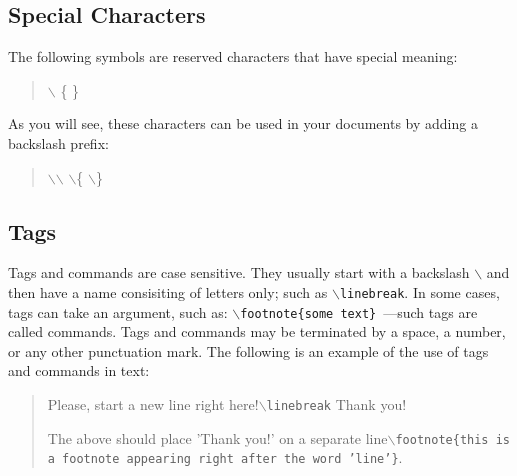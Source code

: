 \documentclass[11pt]{article}
\newcommand{\cmd}[1]{{\tt $\backslash$#1}}
\begin{document}
\newpage

\subsection{Special Characters}

The following symbols are reserved characters that have special
meaning:

\begin{quote}
$\backslash$ \{ \}
\end{quote}

\noindent As you will see, these characters can be used in your documents
by adding a backslash prefix:

\begin{quote}
$\backslash$$\backslash$ $\backslash$\{ $\backslash$\}
\end{quote}









\subsection{Tags}

Tags and commands are case sensitive. They usually start with a
backslash $\backslash$ and then have a name consisiting of letters
only; such as \cmd{linebreak}. In some cases, tags can take an argument,
such as: \cmd{footnote\{some text\}}\ ---such tags are called
commands. Tags and commands may be terminated by a space, a number, or
any other punctuation mark. The following is an example of the use of
tags and commands in text:
\begin{quote}
Please, start a new line right here!\cmd{linebreak} Thank you!

The above should place 'Thank you!' on a separate line\cmd{footnote\{this
is a footnote appearing right after the word 'line'\}}.
\end{quote}
\end{document}
